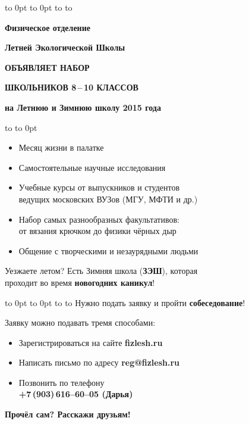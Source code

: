 \documentclass[a5paper,12pt]{article}
\begin{document}
\vbox to 0pt{%
\vbox to 0pt{\vskip1pt
\hbox to \vss}%
}%
\vskip14pt
\hbox to 
\vskip28pt
\centerline{\large\textbf{Физическое отделение}}
\vskip6pt
\centerline{\large\textbf{Летней Экологической Школы}}
\vskip9pt
\centerline{\Large\textsf{\textbf{ОБЪЯВЛЯЕТ НАБОР}}}
\vskip 9pt
\centerline{\Large\textsf{\textbf{ШКОЛЬНИКОВ 8\,--\,10 КЛАССОВ}}}
\vskip 6pt
\centerline{\large\textbf{на Летнюю и Зимнюю школу 2015 года}}
\vskip12pt
\hbox to 
\vskip-24pt\hbox to 0pt{}

{\large%
\begin{itemize}
\setlength{\itemsep}{-4pt}
\setlength{\parindent}{0pt}
\item Месяц жизни в палатке
\item Самостоятельные научные исследования
\item Учебные курсы от выпускников и студентов\\ведущих московских ВУЗов (МГУ, МФТИ и др.)
\item Набор самых разнообразных факультативов:\\от вязания крючком до физики чёрных дыр
\item Общение с творческими и незаурядными людьми
\end{itemize}

Уезжаете летом? Есть Зимняя школа (\textbf{ЗЭШ}), которая\\
проходит во время \textbf{новогодних каникул}!
\vskip-10pt

\vbox to 0pt{%
\vbox to 0pt{%
\vskip27mm
\hbox to \vss}%
}%
\vskip1pt
\hbox to 
\vskip1pt
Нужно подать заявку и пройти \textbf{собеседование}!\par
Заявку можно подавать тремя способами:
\begin{itemize}
\setlength{\itemsep}{-4pt}
\item Зарегистрироваться на сайте \textbf{fizlesh.ru}
\item Написать письмо по адресу \textbf{reg@fizlesh.ru}
\item Позвонить по телефону\\
\textbf{+7\,(903)\,616--60--05 (Дарья)}
\end{itemize}

\textsf{\textbf{Прочёл сам? Расскажи друзьям!}}
}%
\end{document}
